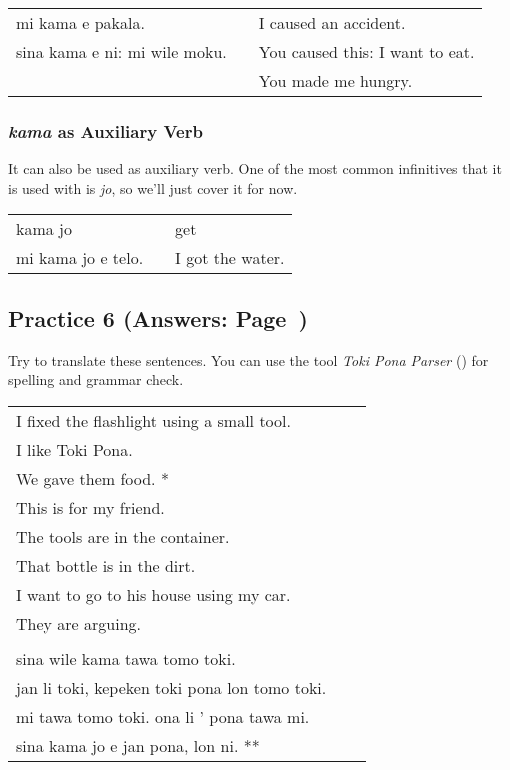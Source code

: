 \begin{supertabular}{p{5,5cm}|ll}
mi kama e pakala. && I caused an accident. \\
sina kama e ni: mi wile moku. && You caused this: I want to eat. \\ && You made me hungry. \\
\end{supertabular} 
%
\subsubsection*{\textit{kama} as Auxiliary Verb}
%
It can also be used as auxiliary verb. 
One of the most common infinitives that it is used with is \textit{jo}, so we'll just cover it for now. 

\begin{supertabular}{p{5,5cm}|ll}
kama jo && get \\
mi kama jo e telo. && I got the water. \\
\end{supertabular} 
%
\subsection*{Practice 6 (Answers: Page~\pageref{'prepositions01'})}
%
Try to translate these sentences. 
You can use the tool \textit{Toki Pona Parser} (\cite{www:rowa:02}) for spelling and grammar check. 

\begin{supertabular}{p{5,5cm}|ll}
I fixed the flashlight using a small tool.  &&  \\ %
I like Toki Pona.   &&   \\ %
We gave them food. * &&    \\ %
This is for my friend.   &&   \\ %
The tools are in the container.   &&   \\ %
That bottle is in the dirt.  &&    \\ %
I want to go to his house using my car.  &&   \\  %
They are arguing.   &&   \\ %
&& \\ %
sina wile kama tawa tomo toki.   &&   \\ %
jan li toki, kepeken toki pona lon tomo toki.  &&    \\ %
mi tawa tomo toki. ona li ' pona tawa mi.  &&   \\  %
sina kama jo e jan pona, lon ni. **  &&   \\ %
\end{supertabular} 

